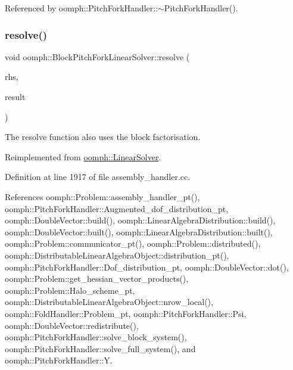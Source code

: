Referenced by oomph\+::\+Pitch\+Fork\+Handler\+::$\sim$\+Pitch\+Fork\+Handler().

\mbox{\label{classoomph_1_1BlockPitchForkLinearSolver_a9a424fd2ae0b67ef8c3ff59f16030786}} 
\subsubsection{\texorpdfstring{resolve()}{resolve()}}
{\footnotesize\ttfamily void oomph\+::\+Block\+Pitch\+Fork\+Linear\+Solver\+::resolve (\begin{DoxyParamCaption}\item[{const \hyperlink{classoomph_1_1DoubleVector}{Double\+Vector} \&}]{rhs,  }\item[{\hyperlink{classoomph_1_1DoubleVector}{Double\+Vector} \&}]{result }\end{DoxyParamCaption})\hspace{0.3cm}{\ttfamily [virtual]}}



The resolve function also uses the block factorisation. 



Reimplemented from \hyperlink{classoomph_1_1LinearSolver_a3b310d08333033edc119b2a5bd7dcbfb}{oomph\+::\+Linear\+Solver}.



Definition at line 1917 of file assembly\+\_\+handler.\+cc.



References oomph\+::\+Problem\+::assembly\+\_\+handler\+\_\+pt(), oomph\+::\+Pitch\+Fork\+Handler\+::\+Augmented\+\_\+dof\+\_\+distribution\+\_\+pt, oomph\+::\+Double\+Vector\+::build(), oomph\+::\+Linear\+Algebra\+Distribution\+::build(), oomph\+::\+Double\+Vector\+::built(), oomph\+::\+Linear\+Algebra\+Distribution\+::built(), oomph\+::\+Problem\+::communicator\+\_\+pt(), oomph\+::\+Problem\+::distributed(), oomph\+::\+Distributable\+Linear\+Algebra\+Object\+::distribution\+\_\+pt(), oomph\+::\+Pitch\+Fork\+Handler\+::\+Dof\+\_\+distribution\+\_\+pt, oomph\+::\+Double\+Vector\+::dot(), oomph\+::\+Problem\+::get\+\_\+hessian\+\_\+vector\+\_\+products(), oomph\+::\+Problem\+::\+Halo\+\_\+scheme\+\_\+pt, oomph\+::\+Distributable\+Linear\+Algebra\+Object\+::nrow\+\_\+local(), oomph\+::\+Fold\+Handler\+::\+Problem\+\_\+pt, oomph\+::\+Pitch\+Fork\+Handler\+::\+Psi, oomph\+::\+Double\+Vector\+::redistribute(), oomph\+::\+Pitch\+Fork\+Handler\+::solve\+\_\+block\+\_\+system(), oomph\+::\+Pitch\+Fork\+Handler\+::solve\+\_\+full\+\_\+system(), and oomph\+::\+Pitch\+Fork\+Handler\+::Y.

